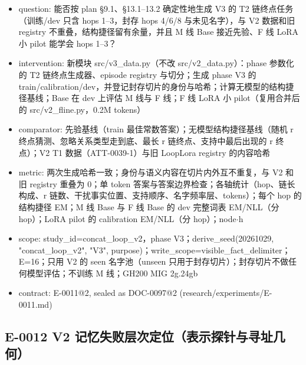 \documentclass[11pt]{article}
\begin{document}
\begin{itemize}
\item question: 能否按 plan §9.1、§13.1--13.2 确定性地生成 V3 的 T2 链终点任务（训练/dev 只含 hops 1--3，封存 hops 4/6/8 与未见名字），与 V2 数据和旧 registry 不重叠，结构捷径留有余量，并且 M 线 Base 接近先验、F 线 LoRA 小 pilot 能学会 hops 1--3？
\item intervention: 新模块 src/v3\_data.py（不改 src/v2\_data.py）：phase 参数化的 T2 链终点生成器、episode registry 与切分；生成 phase V3 的 train/calibration/dev，并登记封存切片的身份与哈希；计算无模型的结构捷径基线；Base 在 dev 上评估 M 线与 F 线；F 线 LoRA 小 pilot（复用合并后的 src/v2\_fline.py，0.2M tokens）
\item comparator: 先验基线（train 最佳常数答案）；无模型结构捷径基线（随机 r 终点猜测、忽略关系类型走到底、最长 r 链终点、支持中最后出现的 r 终点）；V2 T1 数据（ATT-0039-1）与旧 LoopLora registry 的内容哈希
\item metric: 两次生成哈希一致；身份与语义内容在切片内外互不重复，与 V2 和旧 registry 重叠为 0；单 token 答案与答案边界检查；各轴统计（hop、链长构成、r 链数、干扰事实位置、支持顺序、名字频率层、tokens）；每个 hop 的结构捷径 EM；M 线 Base 与 F 线 Base 的 dev 完整词表 EM/NLL（分 hop）；LoRA pilot 的 calibration EM/NLL（分 hop）；node\ensuremath{\cdot}h
\item scope: study\_id=concat\_loop\_v2，phase V3；derive\_seed(20261029, "concat\_loop\_v2", "V3", purpose)；write\_scope=visible\_fact\_delimiter；E=16；只用 V2 的 seen 名字池（unseen 只用于封存切片）；封存切片不做任何模型评估；不训练 M 线；GH200 MIG 2g.24gb
\item contract: E-0011@2, sealed as DOC-0097@2 (research/experiments/E-0011.md)
\end{itemize}

\subsection*{E-0012 V2 记忆失败层次定位（表示探针与寻址几何）}
\end{document}
